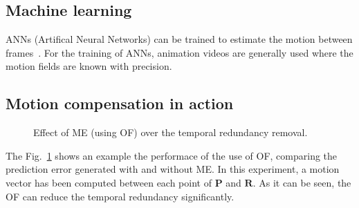 \subsection{Machine learning}
ANNs (Artifical Neural Networks) can be trained to estimate the motion
between frames~\cite{dosovitskiy2015flownet}. For the training of
ANNs, animation videos are generally used where the motion fields are
known with precision.

\subsection{Motion compensation in action}
\begin{figure}
  \caption{Effect of ME (using OF) over the temporal redundancy
    removal.}
  \label{fig:MC}
\end{figure}
The Fig.~\ref{fig:MC} shows an example the performace of the use of
OF, comparing the prediction error generated with and without ME. In
this experiment, a motion vector has been computed between each point
of ${\mathbf P}$ and ${\mathbf R}$. As it can be seen, the OF can
reduce the temporal redundancy significantly.

